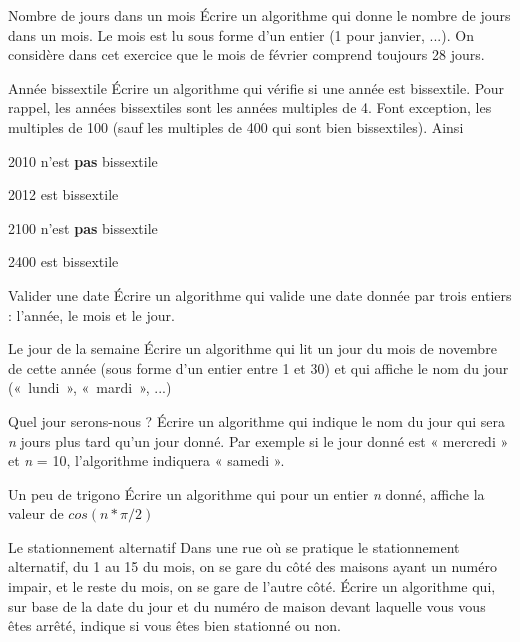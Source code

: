 \begin{Exercice}{Nombre de jours dans un mois}
Écrire un algorithme qui donne le nombre de jours dans un mois. Le mois
est lu sous forme d'un entier (1 pour janvier, ...).
On considère dans cet exercice que le mois de février
comprend toujours 28 jours.
\end{Exercice}


\begin{Exercice}{Année bissextile}
Écrire un algorithme qui vérifie si une année est bissextile. Pour
rappel, les années bissextiles sont les années multiples de 4. Font
exception, les multiples de 100 (sauf les multiples de 400 qui sont
bien bissextiles). Ainsi

\begin{liste}
\item {
2010 n'est \textbf{pas} bissextile}
\item {
2012 est bissextile}
\item {
2100 n'est \textbf{pas} bissextile}
\item {
2400 est bissextile}
\end{liste}

\end{Exercice}

\begin{Exercice}{Valider une date}
{
Écrire un algorithme qui valide une date donnée par trois entiers :
l’année, le mois et le jour.}
\end{Exercice}

\begin{Exercice}{Le jour de la semaine}
{
Écrire un algorithme qui lit un jour du mois de novembre de cette année
(sous forme d'un entier entre 1 et 30) et qui affiche le nom du jour
(«~lundi~», «~mardi~», ...)}
\end{Exercice}

\begin{Exercice}{Quel jour serons-nous ?}
{
Écrire un algorithme qui indique le nom du jour qui sera \textit{n}
jours plus tard qu’un jour donné. Par exemple si le jour donné est «
mercredi » et \textit{n} = 10, l’algorithme indiquera « samedi ».}
\end{Exercice}

\begin{Exercice}{Un peu de trigono}
Écrire un algorithme qui pour un entier \textit{n} donné, affiche la
valeur de $cos(n * \pi/2)$
\end{Exercice}

\begin{Exercice}{Le stationnement alternatif}
{
Dans une rue où se pratique le stationnement alternatif, du 1 au 15 du
mois, on se gare du côté des maisons ayant un numéro impair, et le
reste du mois, on se gare de l'autre côté. Écrire un
algorithme qui, sur base de la date du jour et du numéro de maison
devant laquelle vous vous êtes arrêté, indique si vous êtes bien
stationné ou non. }
\end{Exercice}
